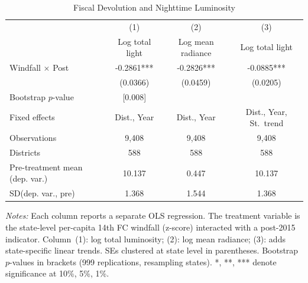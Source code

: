 \begin{table}[htbp]
\centering
\caption{Fiscal Devolution and Nighttime Luminosity}
\label{tab:main}
\small
\begin{tabular}{lccc}
\toprule
 & (1) & (2) & (3) \\
 & Log total light & Log mean radiance & Log total light \\
\midrule
Windfall $\times$ Post & -0.2861*** & -0.2826*** & -0.0885*** \\
 & (0.0366) & (0.0459) & (0.0205) \\
Bootstrap $p$-value & [0.008] & & \\
\midrule
Fixed effects & Dist., Year & Dist., Year & Dist., Year, St.\ trend \\
Observations & 9,408 & 9,408 & 9,408 \\
Districts & 588 & 588 & 588 \\
Pre-treatment mean (dep. var.) & 10.137 & 0.447 & 10.137 \\
SD(dep. var., pre) & 1.368 & 1.544 & 1.368 \\
\bottomrule
\end{tabular}
\par\vspace{0.3em}
{\scriptsize \textit{Notes:} Each column reports a separate OLS regression. The treatment variable is the state-level per-capita 14th FC windfall (z-score) interacted with a post-2015 indicator. Column~(1): log total luminosity; (2): log mean radiance; (3): adds state-specific linear trends. SEs clustered at state level in parentheses. Bootstrap $p$-values in brackets (999 replications, resampling states). *, **, *** denote significance at 10\%, 5\%, 1\%.}
\end{table}
